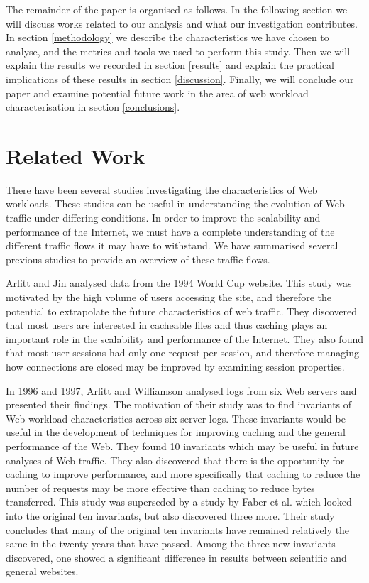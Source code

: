 \documentclass[10pt,conference]{IEEEtran}
\begin{document}
The remainder of the paper is organised as follows. In the following section we will discuss works related to our analysis and what our investigation contributes. In section \ref{methodology} we describe the characteristics we have chosen to analyse, and the metrics and tools we used to perform this study. Then we will explain the results we recorded in section \ref{results} and explain the practical implications of these results in section \ref{discussion}. Finally, we will conclude our paper and examine potential future work in the area of web workload characterisation in section \ref{conclusions}.

\section{Related Work}\label{related_work}
There have been several studies investigating the characteristics of Web workloads. These studies can be useful in understanding the evolution of Web traffic under differing conditions. In order to improve the scalability and performance of the Internet, we must have a complete understanding of the different traffic flows it may have to withstand. We have summarised several previous studies to provide an overview of these traffic flows. 

Arlitt and Jin \cite{world_cup} analysed data from the 1994 World Cup website. This study was motivated by the high volume of users accessing the site, and therefore the potential to extrapolate the future characteristics of web traffic. They discovered that most users are interested in cacheable files and thus caching plays an important role in the scalability and performance of the Internet. They also found that most user sessions had only one request per session, and therefore managing how connections are closed may be improved by examining session properties.

In 1996 and 1997, Arlitt and Williamson \cite{keynote, invariants} analysed logs from six Web servers and presented their findings. The motivation of their study was to find invariants of Web workload characteristics across six server logs. These invariants would be useful in the development of techniques for improving caching and the general performance of the Web. They found 10 invariants which may be useful in future analyses of Web traffic. They also discovered that there is the opportunity for caching to improve performance, and more specifically that caching to reduce the number of requests may be more effective than caching to reduce bytes transferred. 
This study was superseded by a study by Faber et al. \cite{Faber} which looked into the original ten invariants, but also discovered three more. Their study concludes that many of the original ten invariants have remained relatively the same in the twenty years that have passed. Among the three new invariants discovered, one showed a significant difference in results between scientific and general websites.
\end{document}
